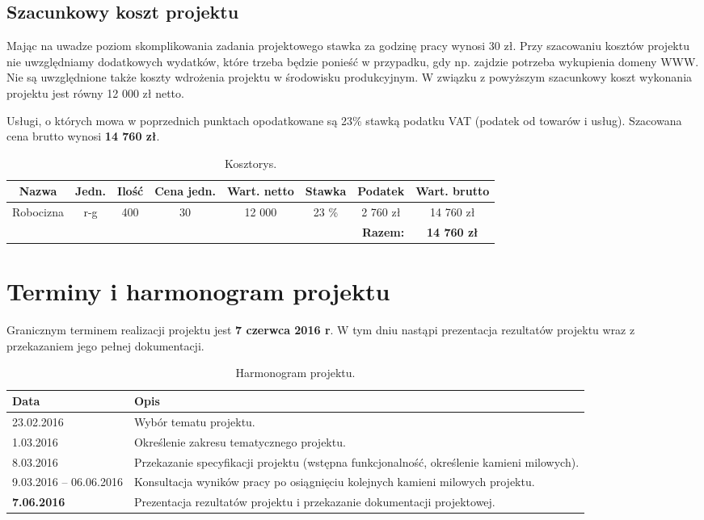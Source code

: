 \documentclass[a4paper, 11pt]{article}
\begin{document}
	\subsection*{Szacunkowy koszt projektu}
	Mając na uwadze poziom skomplikowania zadania projektowego stawka za godzinę pracy wynosi 30 zł. Przy szacowaniu kosztów projektu nie uwzględniamy dodatkowych wydatków, które trzeba będzie ponieść w przypadku, gdy np. zajdzie potrzeba wykupienia domeny WWW. Nie są uwzględnione także koszty wdrożenia projektu w środowisku produkcyjnym. W związku z powyższym szacunkowy koszt wykonania projektu jest równy 12 000 zł netto. 
	
	Usługi, o których mowa w poprzednich punktach opodatkowane są 23\% stawką podatku VAT (podatek od towarów i usług). Szacowana cena brutto wynosi \textbf{14 760 zł}.
	
	\begin{table}[H]
		\centering
		\caption{Kosztorys.}
		\smallskip
		\begin{tabular}{|c|c|c|c|c|c|c|c|}
			\hline
			\textbf{Nazwa} & \textbf{Jedn.} & \textbf{Ilość} & \textbf{Cena jedn.} & \textbf{Wart. netto} & \textbf{Stawka} & \textbf{Podatek} & \textbf{Wart. brutto} \\\hline
			Robocizna & r-g & 400 & 30 & 12 000 & 23 \% & 2 760 zł & 14 760 zł \\\hline
			\multicolumn{7}{r|}{\bf Razem:} & \textbf{14 760 zł} \\\cline{8-8}
		\end{tabular}
	\end{table}
		
	\section{Terminy i harmonogram projektu}
	Granicznym terminem realizacji projektu jest \textbf{7 czerwca 2016 r}. W tym dniu nastąpi prezentacja rezultatów projektu wraz z przekazaniem jego pełnej dokumentacji.
	
	\begin{table}[H]
		\centering
		\caption{Harmonogram projektu.}
		\smallskip
		\begin{tabular}{p{4cm}p{8cm}}
			\textbf{Data}& \textbf{Opis} \\\hline
			23.02.2016 & Wybór tematu projektu. \\\hline
			1.03.2016 & Określenie zakresu tematycznego projektu. \\\hline
			8.03.2016 & Przekazanie specyfikacji projektu (wstępna funkcjonalność, określenie kamieni milowych). \\\hline
			9.03.2016 -- 06.06.2016 & Konsultacja wyników pracy po osiągnięciu kolejnych kamieni milowych projektu. \\\hline
			\textbf{7.06.2016} & Prezentacja rezultatów projektu i przekazanie dokumentacji projektowej. \\\hline
		\end{tabular}
	\end{table}
	
\end{document}
